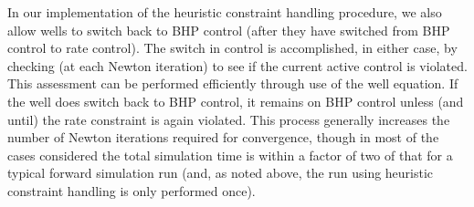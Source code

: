In our implementation of the heuristic constraint handling procedure, we also allow wells to switch back to BHP control (after they have switched from BHP control to rate control). The switch in control is accomplished, in either case, by checking (at each Newton iteration) to see if the current active control is violated. This assessment can be performed efficiently through use of the well equation. If the well does switch back to BHP control, it remains on BHP control unless (and until) the rate constraint is again violated. This process generally increases the number of Newton iterations required for convergence, though in most of the cases considered the total simulation time is within a factor of two of that for a typical forward simulation run (and, as noted above, the run using heuristic constraint handling is only performed once). 





